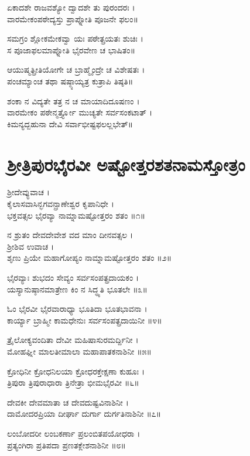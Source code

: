 ಏಕಾದಶೇ ರಾಜವಶ್ಯೋ ದ್ವಾದಶೇ ತು ಪುರಂದರಃ ।\\
ವಾರಮೇಕಂಪಠೇದ್ಯಸ್ತು ಪ್ರಾಪ್ನೋತಿ ಪೂಜನೇ ಫಲಂ॥

ಸಮಗ್ರಂ ಶ್ಲೋಕಮೇಕವ್ವಾ ಯಃ ಪಠೇತ್ಪ್ರಯತಃ ಶುಚಿಃ ।\\
ಸ ಪೂಜಾಫಲಮಾಪ್ನೋತಿ ಭೈರವೇಣ ಚ ಭಾಷಿತಂ॥

ಆಯುಷ್ಮತ್ಪ್ರೀತಿಯೋಗೇ ಚ ಬ್ರಾಹ್ಮೈಂದ್ರೇ ಚ ವಿಶೇಷತಃ ।\\
ಪಂಚಮ್ಯಾಂಚ ತಥಾ ಷಷ್ಠ್ಯಾಯ್ಯತ್ರ ಕುತ್ರಾಪಿ ತಿಷ್ಠತಿ॥

ಶಂಕಾ ನ ವಿದ್ಯತೇ ತತ್ರ ನ ಚ ಮಾಯಾದಿದೂಷಣಂ ।\\
ವಾರಮೇಕಂ ಪಠೇನ್ಮರ್ತ್ತ್ಯೋ ಮುಚ್ಯತೇ ಸರ್ವಸಂಕಟಾತ್ ।\\
ಕಿಮನ್ಯದ್ಬಹುನಾ ದೇವಿ ಸರ್ವಾಭೀಷ್ಟಫಲಲ್ಲಭೇತ್॥

\section{ಶ್ರೀತ್ರಿಪುರಭೈರವೀ ಅಷ್ಟೋತ್ತರಶತನಾಮಸ್ತೋತ್ರಂ}


ಶ್ರೀದೇವ್ಯುವಾಚ ।\\
ಕೈಲಾಸವಾಸಿನ್ಭಗವನ್ಪ್ರಾಣೇಶ್ವರ ಕೃಪಾನಿಧೇ ।\\
ಭಕ್ತವತ್ಸಲ ಭೈರವ್ಯಾ ನಾಮ್ನಾಮಷ್ಟೋತ್ತರಂ ಶತಂ ॥೧॥

ನ ಶ್ರುತಂ ದೇವದೇವೇಶ ವದ ಮಾಂ ದೀನವತ್ಸಲ ।\\
ಶ್ರೀಶಿವ ಉವಾಚ ।\\
ಶೃಣು ಪ್ರಿಯೇ ಮಹಾಗೋಪ್ಯಂ ನಾಮ್ನಾಮಷ್ಟೋತ್ತರಂ ಶತಂ ॥೨॥

ಭೈರವ್ಯಾಃ ಶುಭದಂ ಸೇವ್ಯಂ ಸರ್ವಸಂಪತ್ಪ್ರದಾಯಕಂ ।\\
ಯಸ್ಯಾನುಷ್ಠಾನಮಾತ್ರೇಣ ಕಿಂ ನ ಸಿದ್ಧ್ಯತಿ ಭೂತಲೇ ॥೩॥

ಓಂ ಭೈರವೀ ಭೈರವಾರಾಧ್ಯಾ ಭೂತಿದಾ ಭೂತಭಾವನಾ ।\\
ಕಾರ್ಯ್ಯಾ ಬ್ರಾಹ್ಮೀ ಕಾಮಧೇನುಃ ಸರ್ವಸಂಪತ್ಪ್ರದಾಯಿನೀ ॥೪॥

ತ್ರೈಲೋಕ್ಯವಂದಿತಾ ದೇವೀ ಮಹಿಷಾಸುರಮರ್ದ್ದಿನೀ ।\\
ಮೋಹಘ್ನೀ ಮಾಲತೀಮಾಲಾ ಮಹಾಪಾತಕನಾಶಿನೀ ॥೫॥

ಕ್ರೋಧಿನೀ ಕ್ರೋಧನಿಲಯಾ ಕ್ರೋಧರಕ್ತೇಕ್ಷಣಾ ಕುಹೂಃ ।\\
ತ್ರಿಪುರಾ ತ್ರಿಪುರಾಧಾರಾ ತ್ರಿನೇತ್ರಾ ಭೀಮಭೈರವೀ ॥೬॥

ದೇವಕೀ ದೇವಮಾತಾ ಚ ದೇವದುಷ್ಟವಿನಾಶಿನೀ ।\\
ದಾಮೋದರಪ್ರಿಯಾ ದೀರ್ಘಾ ದುರ್ಗಾ ದುರ್ಗತಿನಾಶಿನೀ ॥೭॥

ಲಂಬೋದರೀ ಲಂಬಕರ್ಣಾ ಪ್ರಲಂಬಿತಪಯೋಧರಾ ।\\
ಪ್ರತ್ಯಂಗಿರಾ ಪ್ರತಿಪದಾ ಪ್ರಣತಕ್ಲೇಶನಾಶಿನೀ ॥೮॥

